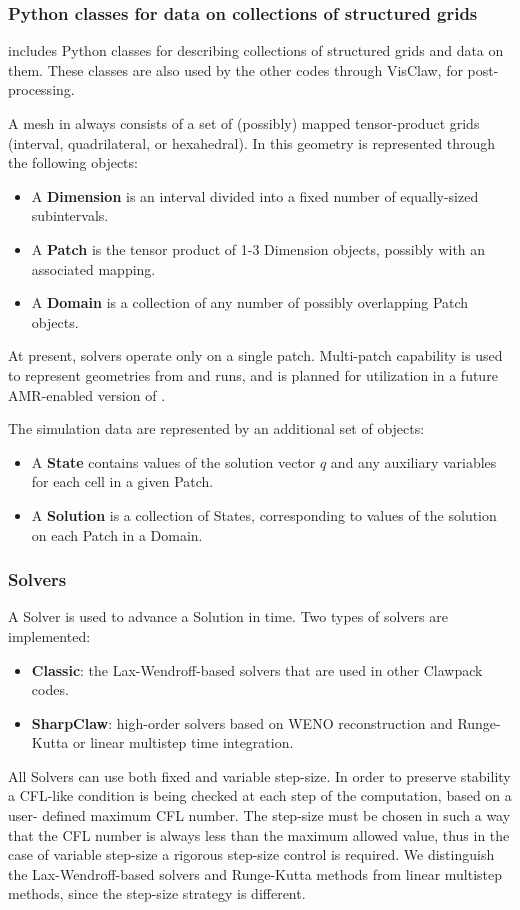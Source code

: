 \subsubsection{Python classes for data on collections of structured grids}
\pyclaw includes Python classes for describing collections of structured grids
and data on them. These classes are also used by the other codes through
VisClaw, for post-processing.

A mesh in \clawpack always consists of a set of (possibly) mapped tensor-product
grids (interval, quadrilateral, or hexahedral).  In \pyclaw this geometry is
represented through the following objects:
\begin{itemize}
    \item A {\bf Dimension} is an interval divided into a fixed number of equally-sized subintervals.
    \item A {\bf Patch} is the tensor product of 1-3 Dimension objects, possibly with an associated mapping.
    \item A {\bf Domain} is a collection of any number of possibly overlapping Patch objects.
\end{itemize}
At present, \pyclaw solvers operate only on a single patch.  Multi-patch
capability is used to represent geometries from \amrclaw and \geoclaw runs, and
is planned for utilization in a future AMR-enabled version of \pyclaw.

The simulation data are represented by an additional set of objects:
\begin{itemize}
    \item A {\bf State} contains values of the solution vector $q$ and any
        auxiliary variables for each cell in a given Patch.
    \item A {\bf Solution} is a collection of States, corresponding to values of the solution
        on each Patch in a Domain.
\end{itemize}

\subsubsection{\pyclaw Solvers} A Solver is used to advance a Solution in time.
Two types of solvers are implemented: 
\begin{itemize}     
    \item {\bf Classic}:  the Lax-Wendroff-based solvers that are used in other
    Clawpack codes.     
    \item {\bf SharpClaw}: high-order solvers based on WENO reconstruction and
    Runge-Kutta or linear multistep time integration. 
\end{itemize} 
All \pyclaw Solvers can use
both fixed and variable step-size. In order to preserve stability a CFL-like
condition is being checked at each step of the computation, based on a user-
defined maximum CFL number. The step-size must be chosen in such a way that the
CFL number is always less than the maximum allowed  value, thus in the case of
variable step-size a rigorous step-size control is required. We distinguish the
Lax-Wendroff-based solvers and Runge-Kutta methods from linear multistep
methods, since the step-size strategy is different.

